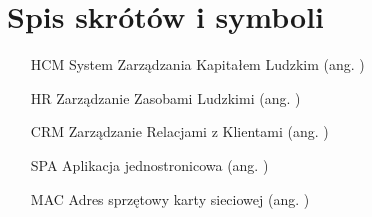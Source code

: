 \chapter{Spis skrótów i symboli}

\begin{itemize}
    \item[HCM] System Zarządzania Kapitałem Ludzkim (ang. )
    \item[HR] Zarządzanie Zasobami Ludzkimi (ang. )
    \item[CRM] Zarządzanie Relacjami z Klientami (ang. )
    \item[SPA] Aplikacja jednostronicowa (ang. )
    \item[MAC] Adres sprzętowy karty sieciowej (ang. )
\end{itemize}
